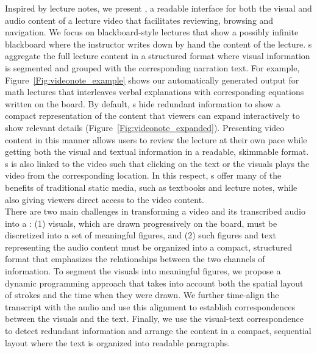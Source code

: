 Inspired by lecture notes, we present \systemname, a readable interface for both the visual and audio content of a lecture video that facilitates reviewing, browsing and navigation. 
%
We focus on blackboard-style lectures that show a possibly infinite blackboard where the instructor writes down by hand the content of the lecture. \systemname s aggregate the full lecture content in a structured format where visual information is segmented and grouped with the corresponding narration text. For example, Figure~\ref{Fig:videonote_example} shows our automatically generated output for math lectures that interleaves verbal explanations with corresponding equations written on the board. 
%
By default, \systemname s hide redundant information to show a compact representation of the content that viewers can expand interactively to show relevant details (Figure~\ref{Fig:videonote_expanded}). 
%
Presenting video content in this manner allows users to review the lecture at their own pace while getting both the visual and textual information in a readable, skimmable format.
%
\systemname s is also linked to the video such that clicking on the text or the visuals plays the video from the corresponding location.
%
In this respect, \systemname s offer many of the benefits of traditional static media, such as textbooks and lecture notes, while also giving viewers direct access to the video content.\\

There are two main challenges in transforming a video and its transcribed audio into a \systemname : (1) visuals, which are drawn progressively on the board, must be discretized into  a set of meaningful figures, and (2) such figures and text representing the audio content must be organized into a compact, structured format that emphasizes the relationships between the two channels of information.
%
To segment the visuals into meaningful figures, we propose a dynamic programming approach that takes into account both the spatial layout of strokes and the time when they were drawn. We further time-align the transcript with the audio and use this alignment to establish correspondences between the visuals and the text. Finally, we use the visual-text correspondence to detect redundant information and arrange the content in a compact, sequential layout where the text is organized into readable paragraphs.\\

